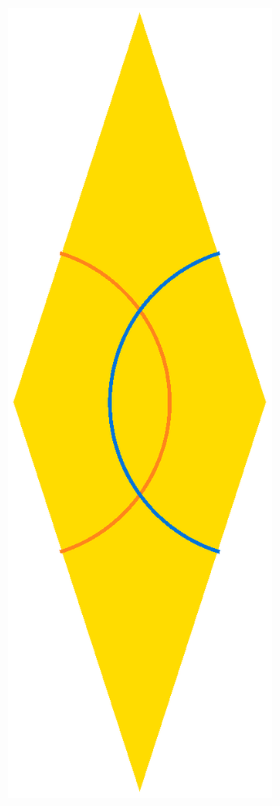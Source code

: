 \documentclass[
  oneside,
  11pt, a4paper,
  footinclude=true,
  headinclude=true,
  cleardoublepage=empty
]{scrbook}
\begin{document}
\begin{figure}[H]
        \begin{subfigure}[b]{\textwidth}
        \begin{subfigure}[b]{0.4\textwidth}
        \centering
		\includegraphics[scale=0.4]{RhombSkinny}

\end{subfigure}
\end{subfigure}
\end{figure}
\end{document}
